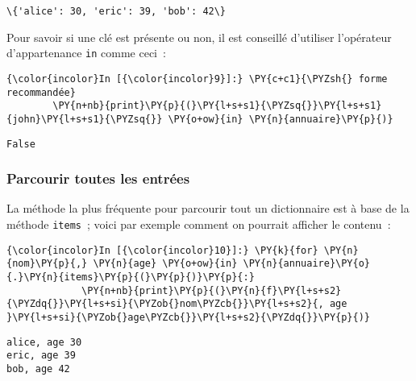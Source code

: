     \begin{Verbatim}[commandchars=\\\{\},frame=single,framerule=0.3mm,rulecolor=\color{cellframecolor}]
\{'alice': 30, 'eric': 39, 'bob': 42\}
\end{Verbatim}

    Pour savoir si une clé est présente ou non, il est conseillé d'utiliser
l'opérateur d'appartenance \texttt{in} comme ceci~:

    \begin{Verbatim}[commandchars=\\\{\},frame=single,framerule=0.3mm,rulecolor=\color{cellframecolor}]
{\color{incolor}In [{\color{incolor}9}]:} \PY{c+c1}{\PYZsh{} forme recommandée}
        \PY{n+nb}{print}\PY{p}{(}\PY{l+s+s1}{\PYZsq{}}\PY{l+s+s1}{john}\PY{l+s+s1}{\PYZsq{}} \PY{o+ow}{in} \PY{n}{annuaire}\PY{p}{)}
\end{Verbatim}


    \begin{Verbatim}[commandchars=\\\{\},frame=single,framerule=0.3mm,rulecolor=\color{cellframecolor}]
False
\end{Verbatim}

    \hypertarget{parcourir-toutes-les-entruxe9es}{%
\subsubsection{Parcourir toutes les
entrées}\label{parcourir-toutes-les-entruxe9es}}

    La méthode la plus fréquente pour parcourir tout un dictionnaire est à
base de la méthode \texttt{items}~; voici par exemple comment on
pourrait afficher le contenu~:

    \begin{Verbatim}[commandchars=\\\{\},frame=single,framerule=0.3mm,rulecolor=\color{cellframecolor}]
{\color{incolor}In [{\color{incolor}10}]:} \PY{k}{for} \PY{n}{nom}\PY{p}{,} \PY{n}{age} \PY{o+ow}{in} \PY{n}{annuaire}\PY{o}{.}\PY{n}{items}\PY{p}{(}\PY{p}{)}\PY{p}{:}
             \PY{n+nb}{print}\PY{p}{(}\PY{n}{f}\PY{l+s+s2}{\PYZdq{}}\PY{l+s+si}{\PYZob{}nom\PYZcb{}}\PY{l+s+s2}{, age }\PY{l+s+si}{\PYZob{}age\PYZcb{}}\PY{l+s+s2}{\PYZdq{}}\PY{p}{)}
\end{Verbatim}


    \begin{Verbatim}[commandchars=\\\{\},frame=single,framerule=0.3mm,rulecolor=\color{cellframecolor}]
alice, age 30
eric, age 39
bob, age 42
\end{Verbatim}

